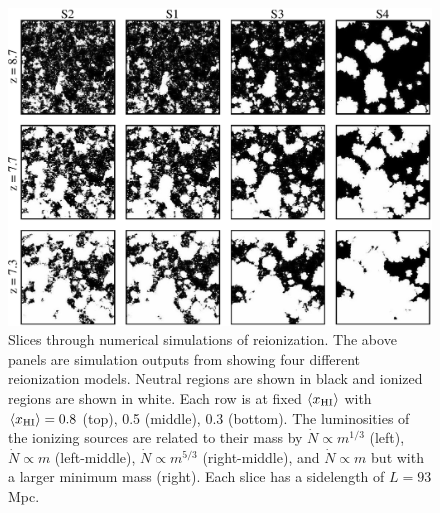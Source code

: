 \begin{figure}[!p]
  \centering
  \includegraphics[width=14cm]{McQuinnHIITopology.eps}
  \caption{Slices through numerical simulations of reionization. The above panels are simulation outputs from \citet{McQuinn2007} showing four different reionization models. Neutral regions are shown in black and ionized regions are shown in white. Each row is at fixed $\langle x_{\text{HI}}\rangle$ with $\langle x_{\text{HI}}\rangle = 0.8$ (top), 0.5 (middle), 0.3 (bottom). The luminosities of the ionizing sources are related to their mass by $\dot{N} \propto m^{1/3}$ (left), $\dot{N} \propto m$ (left-middle), $\dot{N}\propto m^{5/3}$ (right-middle), and $\dot{N} \propto m$ but with a larger minimum mass (right). Each slice has a sidelength of $L = 93$ Mpc. }
  \label{fig:McQuinnMorph}
\end{figure}


